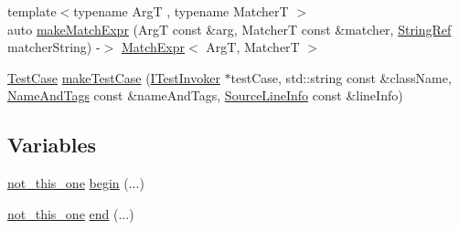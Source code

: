 \begin{DoxyCompactItemize}
\item 
{\footnotesize template$<$typename Arg\-T , typename Matcher\-T $>$ }\\auto \hyperlink{namespace_catch_a08c0e847b66dc31e1174aa9a74a441c9}{make\-Match\-Expr} (Arg\-T const \&arg, Matcher\-T const \&matcher, \hyperlink{class_catch_1_1_string_ref}{String\-Ref} matcher\-String) -\/$>$ \hyperlink{class_catch_1_1_match_expr}{Match\-Expr}$<$ Arg\-T, Matcher\-T $>$
\item 
\hyperlink{class_catch_1_1_test_case}{Test\-Case} \hyperlink{namespace_catch_a5e63df38d06a43d4cee17454e724b5c0}{make\-Test\-Case} (\hyperlink{struct_catch_1_1_i_test_invoker}{I\-Test\-Invoker} $\ast$test\-Case, std\-::string const \&class\-Name, \hyperlink{struct_catch_1_1_name_and_tags}{Name\-And\-Tags} const \&name\-And\-Tags, \hyperlink{struct_catch_1_1_source_line_info}{Source\-Line\-Info} const \&line\-Info)
\end{DoxyCompactItemize}
\subsection*{Variables}
\begin{DoxyCompactItemize}
\item 
\hyperlink{struct_catch_1_1not__this__one}{not\-\_\-this\-\_\-one} \hyperlink{namespace_catch_ac7ccff5c186bffa3b448b218ecf15956}{begin} (...)
\item 
\hyperlink{struct_catch_1_1not__this__one}{not\-\_\-this\-\_\-one} \hyperlink{namespace_catch_a71fef6a57614eb2d9751f8586ff6de6a}{end} (...)
\end{DoxyCompactItemize}


